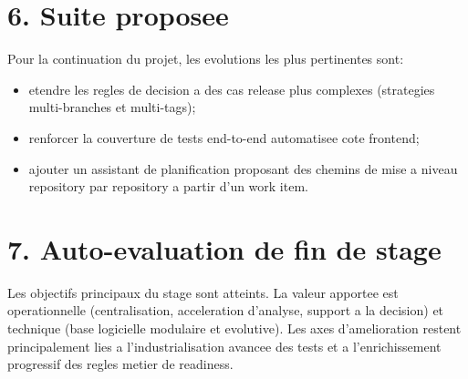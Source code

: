 \section*{6. Suite proposee}

Pour la continuation du projet, les evolutions les plus pertinentes sont:

\begin{itemize}
  \item etendre les regles de decision a des cas release plus complexes
  (strategies multi-branches et multi-tags);
  \item renforcer la couverture de tests end-to-end automatisee cote frontend;
  \item ajouter un assistant de planification proposant des chemins de mise a
  niveau repository par repository a partir d'un work item.
\end{itemize}

\section*{7. Auto-evaluation de fin de stage}

Les objectifs principaux du stage sont atteints. La valeur apportee est
operationnelle (centralisation, acceleration d'analyse, support a la decision)
et technique (base logicielle modulaire et evolutive). Les axes d'amelioration
restent principalement lies a l'industrialisation avancee des tests et a
l'enrichissement progressif des regles metier de readiness.
